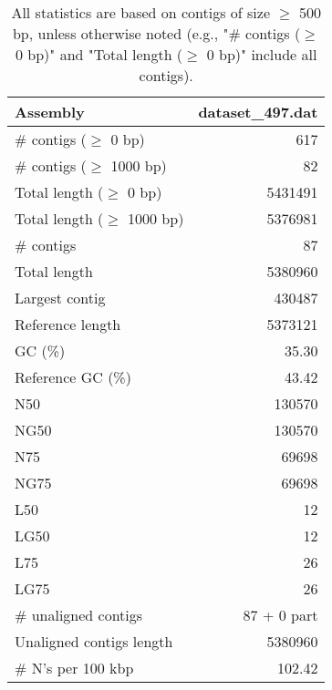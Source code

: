 \documentclass[12pt,a4paper]{article}
\begin{document}
\begin{table}[ht]
\begin{center}
\caption{All statistics are based on contigs of size $\geq$ 500 bp, unless otherwise noted (e.g., "\# contigs ($\geq$ 0 bp)" and "Total length ($\geq$ 0 bp)" include all contigs).}
\begin{tabular}{|l*{1}{|r}|}
\hline
Assembly & dataset\_497.dat \\ \hline
\# contigs ($\geq$ 0 bp) & 617 \\ \hline
\# contigs ($\geq$ 1000 bp) & 82 \\ \hline
Total length ($\geq$ 0 bp) & 5431491 \\ \hline
Total length ($\geq$ 1000 bp) & 5376981 \\ \hline
\# contigs & 87 \\ \hline
Total length & 5380960 \\ \hline
Largest contig & 430487 \\ \hline
Reference length & 5373121 \\ \hline
GC (\%) & 35.30 \\ \hline
Reference GC (\%) & 43.42 \\ \hline
N50 & 130570 \\ \hline
NG50 & 130570 \\ \hline
N75 & 69698 \\ \hline
NG75 & 69698 \\ \hline
L50 & 12 \\ \hline
LG50 & 12 \\ \hline
L75 & 26 \\ \hline
LG75 & 26 \\ \hline
\# unaligned contigs & 87 + 0 part \\ \hline
Unaligned contigs length & 5380960 \\ \hline
\# N's per 100 kbp & 102.42 \\ \hline
\end{tabular}
\end{center}
\end{table}
\end{document}
